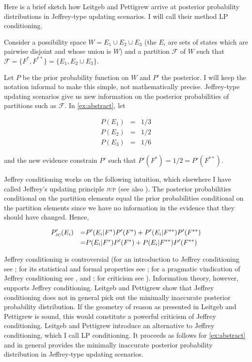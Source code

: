 \documentclass[12pt]{article}
\begin{document}
Here is a brief sketch how Leitgeb and Pettigrew arrive at posterior
probability distributions in Jeffrey-type updating scenarios. I will
call their method LP conditioning.

\begin{quotex}
  \label{ex:abstract} Consider a possibility
  space $W=E_{1}\cup{}E_{2}\cup{}E_{3}$ (the $E_{i}$ are sets of
  states which are pairwise disjoint and whose union is $W$) and a
  partition $\mathcal{F}$ of $W$ such that
  $\mathcal{F}=\{F^{*},F^{**}\}=\{E_{1},E_{2}\cup{}E_{3}\}$.
\end{quotex}

Let $P$ be the prior probability function on $W$ and $P'$ the
posterior. I will keep the notation informal to make this simple, not
mathematically precise. Jeffrey-type updating scenarios give us new
information on the posterior probabilities of partitions such as
$\mathcal{F}$. In {\xample} \ref{ex:abstract}, let

\begin{equation}
  \label{eq:priors}
  \begin{array}{rcl}
    P(E_{1})&=&1/3 \\
    P(E_{2})&=&1/2 \\
    P(E_{3})&=&1/6
  \end{array}
\end{equation}

and the new evidence constrain $P'$ such that
$P'(F^{*})=1/2=P'(F^{**})$.

Jeffrey conditioning works on the following intuition, which elsewhere
I have called Jeffrey's updating principle \textsc{jup} (see also
). The posterior probabilities conditional on the
partition elements equal the prior probabilities conditional on the
partition elements since we have no information in the evidence that
they should have changed. Hence,

\begin{align}
  \label{eq:jc}
  &P'_{\mbox{\tiny JC}}(E_{i})&=&P'(E_{i}|F^{*})P'(F^{*})+P'(E_{i}|F^{**})P'(F^{**})\notag \\
  &&=&P(E_{i}|F^{*})P'(F^{*})+P(E_{i}|F^{**})P'(F^{**})
\end{align}

Jeffrey conditioning is controversial (for an introduction to Jeffrey
conditioning see ; for its statistical and
formal properties see ; for a pragmatic
vindication of Jeffrey conditioning see , and
; for criticism see
). Information theory, however, supports
Jeffrey conditioning. Leitgeb and Pettigrew show that Jeffrey
conditioning does not in general pick out the minimally inaccurate
posterior probability distribution. If the geometry of reason as
presented in Leitgeb and Pettigrew is sound, this would constitute a
powerful criticism of Jeffrey conditioning. Leitgeb and Pettigrew
introduce an alternative to Jeffrey conditioning, which I call LP
conditioning. It proceeds as follows for {\xample} \ref{ex:abstract}
and in general provides the minimally inaccurate posterior probability
distribution in Jeffrey-type updating scenarios.
\end{document}
